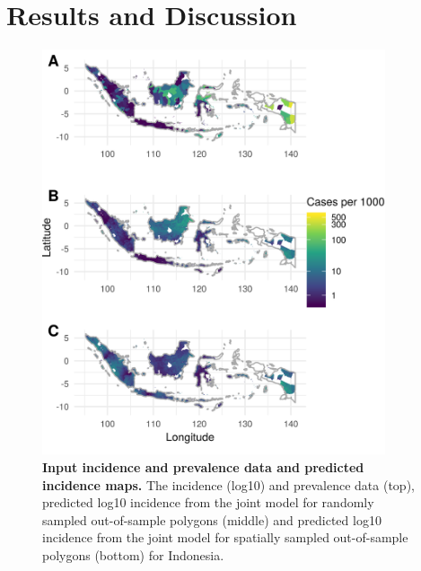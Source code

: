 \documentclass[10pt,letterpaper]{article}
\begin{document}
\section*{Results and Discussion}





\begin{figure}[!h]
\includegraphics[width = 0.9\textwidth]{figures/idn_both_cv12_preds.png}
\caption{{\bf Input incidence and prevalence data and predicted incidence maps. } 
The incidence (log10) and prevalence data (top), predicted log10 incidence from the joint model for randomly sampled out-of-sample polygons (middle) and predicted log10 incidence from the joint model for spatially sampled out-of-sample polygons (bottom) for Indonesia.
}
\label{predobsmapidn}
\end{figure}
\end{document}
